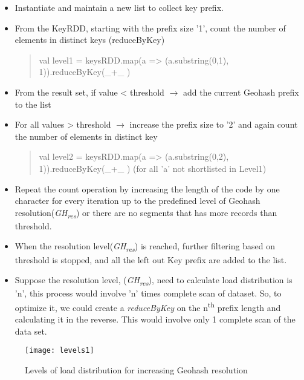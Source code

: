 \documentclass[article,type=msc,colorback,12pt,accentcolor=tud1d]{tudthesis}
\begin{document}
				\begin{itemize}
					\item Instantiate and maintain a new list to collect key prefix.
					
					\item From the KeyRDD, starting with the prefix size '1', count the number of elements in distinct keys (reduceByKey)
						\begin{quote} val level1 = keysRDD.map(a => (a.substring(0,1), 1)).reduceByKey(\_+\_ )
						\end{quote}
						
					\item From the result set, if value < threshold $\to$ add the current Geohash prefix to the list 
					
					\item For all values > threshold $\to$ increase the prefix size to '2' and again count the number of elements in distinct key
						\begin{quote} val level2 = keysRDD.map(a => (a.substring(0,2), 1)).reduceByKey(\_+\_ ) 
							 (for all 'a' not shortlisted in Level1)
							 
						\end{quote}
				 
					\item Repeat the count operation by increasing the length of the code by one character for every iteration up to the predefined level of Geohash resolution(\textit{GH\textsubscript{res}}) or there are no segments that has more records than threshold. 
					\item When the resolution level(\textit{GH\textsubscript{res}}) is reached, further filtering based on threshold is stopped, and all the left out Key prefix are added to the list.
					\item Suppose the resolution level, (\textit{GH\textsubscript{res}}), need to calculate load distribution is 'n', this process would involve 'n' times complete scan of dataset. So, to optimize it, we could create a \textit{reduceByKey} on the n\textsuperscript{th} prefix length and calculating it in the reverse. This would involve only 1 complete scan of the data set. 
				\end{itemize}
															
				\begin{figure}[h]
					\centering
					\texttt{[image: levels1]}
					\caption{Levels of load distribution for increasing Geohash resolution}
					\label{fig:loadlevels}
				\end{figure}
			
\end{document}
